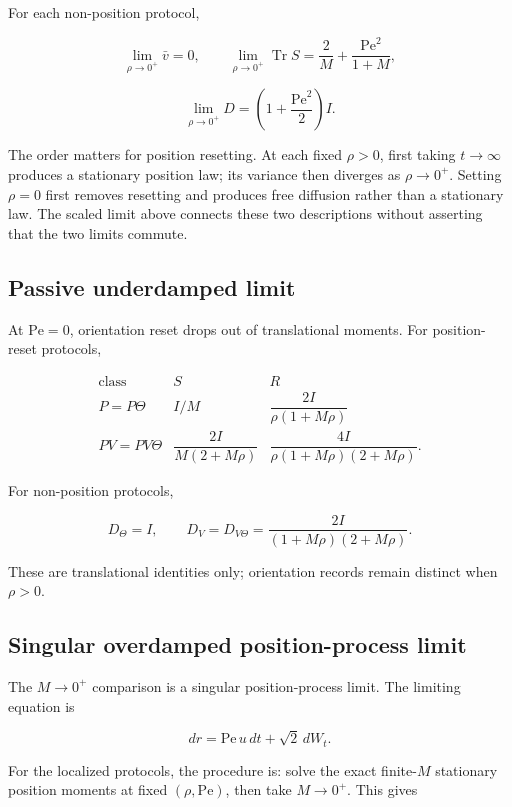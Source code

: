For each non-position protocol,

\[
\lim_{\rho\to0^+}\bar v=0,\qquad
\lim_{\rho\to0^+}\operatorname{Tr}S
=\frac{2}{M}+\frac{\mathrm{Pe}^2}{1+M},
\]

\[
\lim_{\rho\to0^+}D
=\left(1+\frac{\mathrm{Pe}^2}{2}\right)I.
\]

The order matters for position resetting. At each fixed \(\rho>0\), first taking \(t\to\infty\) produces a stationary position law; its variance then diverges as \(\rho\to0^+\). Setting \(\rho=0\) first removes resetting and produces free diffusion rather than a stationary law. The scaled limit above connects these two descriptions without asserting that the two limits commute.

\subsection{Passive underdamped limit}\label{s6.3-passive-underdamped-limit}

At \(\mathrm{Pe}=0\), orientation reset drops out of translational moments. For position-reset protocols,

\[
\begin{array}{c|cc}
\text{class} & S & R\\ \hline
P=P\Theta
& I/M
& \dfrac{2I}{\rho(1+M\rho)}\\[3mm]
PV=PV\Theta
& \dfrac{2I}{M(2+M\rho)}
& \dfrac{4I}{\rho(1+M\rho)(2+M\rho)}.
\end{array}
\]

For non-position protocols,

\[
D_\Theta=I,\qquad
D_V=D_{V\Theta}
=\frac{2I}{(1+M\rho)(2+M\rho)}.
\]

These are translational identities only; orientation records remain distinct when \(\rho>0\).

\subsection{Singular overdamped position-process limit}\label{s6.4-singular-overdamped-position-process-limit}

The \(M\to0^+\) comparison is a singular position-process limit. The limiting equation is

\[
dr=\mathrm{Pe}\,u\,dt+\sqrt2\,dW_t.
\]

For the localized protocols, the procedure is: solve the exact finite-\(M\) stationary position moments at fixed \((\rho,\mathrm{Pe})\), then take \(M\to0^+\). This gives

